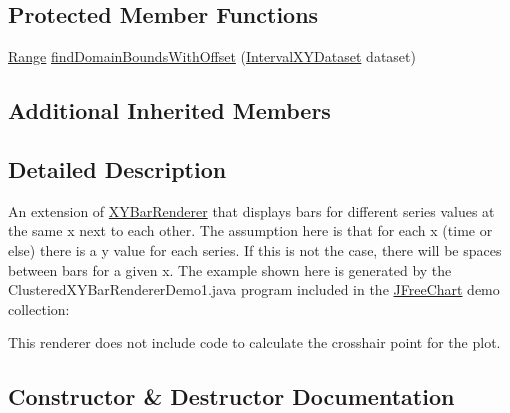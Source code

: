 \subsection*{Protected Member Functions}
\begin{DoxyCompactItemize}
\item 
\mbox{\hyperlink{classorg_1_1jfree_1_1data_1_1_range}{Range}} \mbox{\hyperlink{classorg_1_1jfree_1_1chart_1_1renderer_1_1xy_1_1_clustered_x_y_bar_renderer_a87d7741ef950c0f8fd6c80bb9c7c2edf}{find\+Domain\+Bounds\+With\+Offset}} (\mbox{\hyperlink{interfaceorg_1_1jfree_1_1data_1_1xy_1_1_interval_x_y_dataset}{Interval\+X\+Y\+Dataset}} dataset)
\end{DoxyCompactItemize}
\subsection*{Additional Inherited Members}


\subsection{Detailed Description}
An extension of \mbox{\hyperlink{classorg_1_1jfree_1_1chart_1_1renderer_1_1xy_1_1_x_y_bar_renderer}{X\+Y\+Bar\+Renderer}} that displays bars for different series values at the same x next to each other. The assumption here is that for each x (time or else) there is a y value for each series. If this is not the case, there will be spaces between bars for a given x. The example shown here is generated by the {\ttfamily Clustered\+X\+Y\+Bar\+Renderer\+Demo1.\+java} program included in the \mbox{\hyperlink{classorg_1_1jfree_1_1chart_1_1_j_free_chart}{J\+Free\+Chart}} demo collection\+: ~\newline
~\newline
  

This renderer does not include code to calculate the crosshair point for the plot. 

\subsection{Constructor \& Destructor Documentation}
\mbox{\label{classorg_1_1jfree_1_1chart_1_1renderer_1_1xy_1_1_clustered_x_y_bar_renderer_a7239158b1ed7cd9db1981a2d1dd95934}} 
